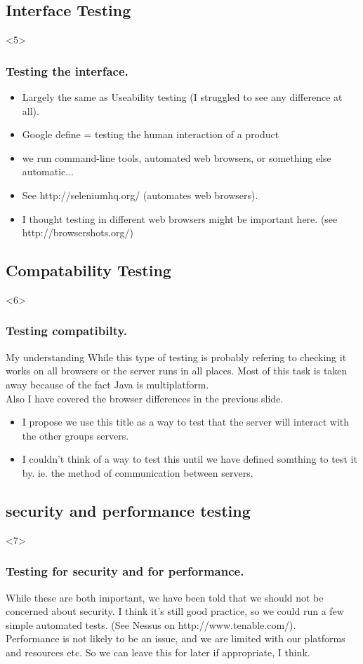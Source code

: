 \documentclass{beamer}
\begin{document}
\subsection{Interface Testing}
\begin{frame}<5>
\frametitle{Testing the interface.}
\begin{itemize}
\item Largely the same as Useability testing (I struggled to see
any difference at all).
\item Google define = testing the human interaction of a product
\item we run command-line tools, automated web browsers, 
or something else automatic...
\item See http://seleniumhq.org/ (automates web browsers).
\item I thought testing in different web browsers might be 
important here. (see http://browsershots.org/)
\end{itemize}
\end{frame}

\subsection{Compatability Testing}
\begin{frame}<6>
\frametitle{Testing compatibilty.}
\begin{block}{My understanding}
While this type of testing is probably refering to checking it 
works on all browsers or the server runs in all places. Most of
this task is taken away because of the fact Java is multiplatform.\\
Also I have covered the browser differences in the previous slide.
\end{block}
\begin{itemize}
\item I propose we use this title as a way to test that the server 
will interact with the other groups servers.
\item I couldn't think of a way to test this until we have defined
somthing to test it by. ie. the method of communication between 
servers.
\end{itemize}
\end{frame}

\subsection{security and performance testing}
\begin{frame}<7>
\frametitle{Testing for security and for performance.}
While these are both important, we have been told that we should
not be concerned about security. I think it's still good practice,
so we could run a few simple automated tests. (See Nessus on 
http://www.tenable.com/).\\
Performance is not likely to be an issue, and we are limited with 
our platforms and resources etc. So we can leave this for later if
appropriate, I think.
\end{frame}
\end{document}
